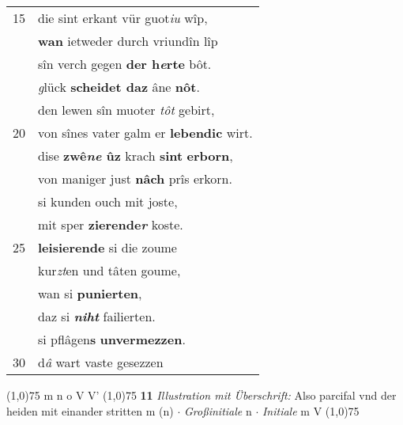 \documentclass[8pt,a4paper,notitlepage]{article}
\begin{document}
\begin{table}[ht]
\begin{minipage}[t]{0.5\linewidth}
\begin{tabular}{rl}
15 & die sint erkant vür guot\textit{iu} wîp,\\ 
 & \textbf{wan} ietweder durch vriundîn lîp\\ 
 & sîn verch gegen \textbf{der h\textit{e}rte} bôt.\\ 
 & \textit{g}lück \textbf{scheidet daz} âne \textbf{nôt}.\\ 
 & den lewen sîn muoter \textit{tôt} gebirt,\\ 
20 & von sînes vater galm er \textbf{lebendic} wirt.\\ 
 & dise \textbf{zwê\textit{ne} ûz} krach \textbf{sint} \textbf{erborn},\\ 
 & von maniger just \textbf{nâch} prîs erkorn.\\ 
 & si kunden ouch mit joste,\\ 
 & mit sper \textbf{zierende\textit{r}} koste.\\ 
25 & \textbf{leisierende} si die zoume\\ 
 & kur\textit{zt}en und tâten goume,\\ 
 & wan si \textbf{punierten},\\ 
 & daz si \textit{\textbf{niht}} failierten.\\ 
 & si pflâgen\textbf{s} \textbf{unvermezzen}.\\ 
30 & d\textit{â} wart vaste gesezzen\\ 
\end{tabular}
\scriptsize
\line(1,0){75} \newline
m n o V V' \newline
\line(1,0){75} \newline
\textbf{11} \textit{Illustration mit Überschrift:} Also parcifal vnd der heiden mit einander stritten m (n)   $\cdot$ \textit{Großinitiale} n   $\cdot$ \textit{Initiale} m V  \newline
\line(1,0){75} \newline

\end{minipage}
\end{table}
\end{document}
